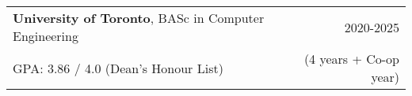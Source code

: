 \begin{tabularx}{\textwidth}{ @{}X r@{} }
    \textbf{University of Toronto}, BASc in Computer Engineering & 2020-2025 \\
    GPA: 3.86 / 4.0 (Dean’s Honour List) & (4 years + Co-op year) \\
\end{tabularx}